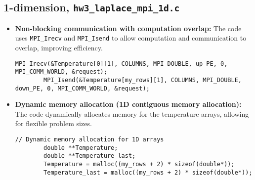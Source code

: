 \documentclass[11pt]{article}
\begin{document}
    \subsection{1-dimension, \texttt{hw3\_laplace\_mpi\_1d.c}}
    \begin{itemize}
      \item \textbf{Non-blocking communication with computation overlap:} The code uses \texttt{MPI\_Irecv} and \texttt{MPI\_Isend} to allow computation and communication to overlap, improving efficiency.      \begin{lstlisting}[style=dm4ds_lstCustom_01]
        MPI_Irecv(&Temperature[0][1], COLUMNS, MPI_DOUBLE, up_PE, 0, MPI_COMM_WORLD, &request);
        MPI_Isend(&Temperature[my_rows][1], COLUMNS, MPI_DOUBLE, down_PE, 0, MPI_COMM_WORLD, &request);
      \end{lstlisting}
      \item \textbf{Dynamic memory allocation (1D contiguous memory allocation):} The code dynamically allocates memory for the temperature arrays, allowing for flexible problem sizes.
      \begin{lstlisting}[style=dm4ds_lstCustom_01]
        // Dynamic memory allocation for 1D arrays
        double **Temperature;
        double **Temperature_last;
        Temperature = malloc((my_rows + 2) * sizeof(double*));
        Temperature_last = malloc((my_rows + 2) * sizeof(double*));
      \end{lstlisting}
    \end{itemize}
\end{document}
